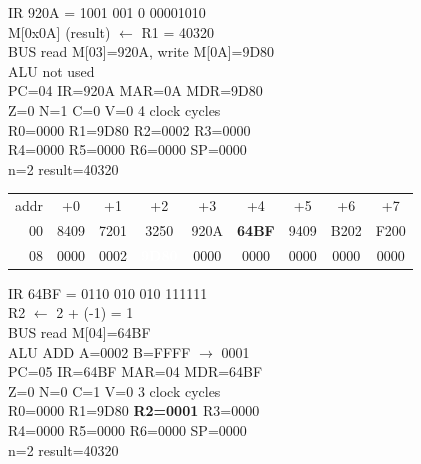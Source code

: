 \noindent\begin{tcolorbox}[stepbox, title={Step 34 \hfill PC 03 \quad ST R1, result}]
\textcolor{dim}{IR} 920A = 1001 001 0 00001010\\
M[0x0A] (result) $\leftarrow$ R1 = 40320\\
\textcolor{dim}{BUS} read M[03]=920A, \textcolor{wrt}{write M[0A]=9D80}\\
\textcolor{dim}{ALU} \textcolor{dim}{not used}\\
PC=04 IR=920A MAR=0A MDR=9D80\\
Z=0 N=1 C=0 V=0 \hfill \textcolor{dim}{4 clock cycles}\\
R0=0000 R1=9D80 R2=0002 R3=0000\\
R4=0000 R5=0000 R6=0000 SP=0000\\
\textcolor{dim}{n=2  result=40320}\\[1pt]
{\setlength{\tabcolsep}{1.6pt}\begin{tabular}{@{}r*{8}{c}@{}}
\textcolor{dim}{addr} & \textcolor{dim}{+0} & \textcolor{dim}{+1} & \textcolor{dim}{+2} & \textcolor{dim}{+3} & \textcolor{dim}{+4} & \textcolor{dim}{+5} & \textcolor{dim}{+6} & \textcolor{dim}{+7}\\
\textcolor{dim}{00} & 8409 & 7201 & 3250 & 920A & \cellcolor{pcc}\textbf{64BF} & 9409 & B202 & F200\\
\textcolor{dim}{08} & 0000 & \cellcolor{datac}0002 & \cellcolor{wrt}\textcolor{white}{\textbf{9D80}} & 0000 & 0000 & 0000 & 0000 & 0000\\
\end{tabular}}
\end{tcolorbox}\hfill\begin{tcolorbox}[stepbox, title={Step 35 \hfill PC 04 \quad ADDI R2, R2, -1}]
\textcolor{dim}{IR} 64BF = 0110 010 010 111111\\
R2 $\leftarrow$ 2 + (-1) = 1\\
\textcolor{dim}{BUS} read M[04]=64BF\\
\textcolor{dim}{ALU} ADD A=0002 B=FFFF $\rightarrow$ 0001\\
PC=05 IR=64BF MAR=04 MDR=64BF\\
Z=0 N=0 C=1 V=0 \hfill \textcolor{dim}{3 clock cycles}\\
R0=0000 R1=9D80 \textcolor{wrt}{\textbf{R2=0001}} R3=0000\\
R4=0000 R5=0000 R6=0000 SP=0000\\
\textcolor{dim}{n=2  result=40320}\\[1pt]
{\setlength{\tabcolsep}{1.6pt}\begin{tabular}{@{}r*{8}{c}@{}}

\end{tabular}}
\end{tcolorbox}
